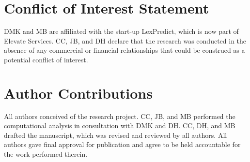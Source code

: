 \documentclass[utf8,sort&compress,table,hidelinks]{frontiersFPHY} %
\begin{document}
%

\section*{Conflict of Interest Statement}

DMK and MB are affiliated with the start-up LexPredict, which is now part of Elevate Services.
CC, JB, and DH declare that the research was conducted in the absence of any commercial or financial relationships that could be construed as a potential conflict of interest.

\section*{Author Contributions}

All authors conceived of the research project. CC, JB, and MB performed the computational analysis in consultation with DMK and DH.
CC, DH, and MB drafted the manuscript, which was revised and reviewed by all authors. All authors gave final approval for publication and agree to be held accountable for the work performed therein.


\end{document}
